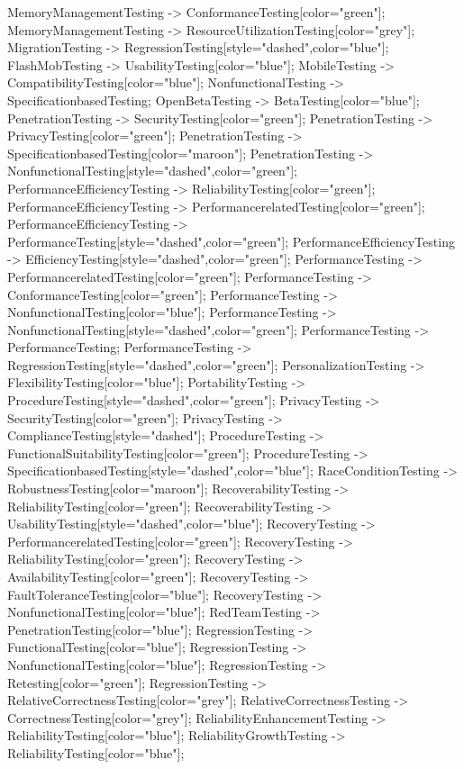 \documentclass{article}
\begin{document}
{MemoryManagementTesting -> ConformanceTesting[color="green"];
MemoryManagementTesting -> ResourceUtilizationTesting[color="grey"];
MigrationTesting -> RegressionTesting[style="dashed",color="blue"];
FlashMobTesting -> UsabilityTesting[color="blue"];
MobileTesting -> CompatibilityTesting[color="blue"];
NonfunctionalTesting -> SpecificationbasedTesting;
OpenBetaTesting -> BetaTesting[color="blue"];
PenetrationTesting -> SecurityTesting[color="green"];
PenetrationTesting -> PrivacyTesting[color="green"];
PenetrationTesting -> SpecificationbasedTesting[color="maroon"];
PenetrationTesting -> NonfunctionalTesting[style="dashed",color="green"];
PerformanceEfficiencyTesting -> ReliabilityTesting[color="green"];
PerformanceEfficiencyTesting -> PerformancerelatedTesting[color="green"];
PerformanceEfficiencyTesting -> PerformanceTesting[style="dashed",color="green"];
PerformanceEfficiencyTesting -> EfficiencyTesting[style="dashed",color="green"];
PerformanceTesting -> PerformancerelatedTesting[color="green"];
PerformanceTesting -> ConformanceTesting[color="green"];
PerformanceTesting -> NonfunctionalTesting[color="blue"];
PerformanceTesting -> NonfunctionalTesting[style="dashed",color="green"];
PerformanceTesting -> PerformanceTesting;
PerformanceTesting -> RegressionTesting[style="dashed",color="green"];
PersonalizationTesting -> FlexibilityTesting[color="blue"];
PortabilityTesting -> ProcedureTesting[style="dashed",color="green"];
PrivacyTesting -> SecurityTesting[color="green"];
PrivacyTesting -> ComplianceTesting[style="dashed"];
ProcedureTesting -> FunctionalSuitabilityTesting[color="green"];
ProcedureTesting -> SpecificationbasedTesting[style="dashed",color="blue"];
RaceConditionTesting -> RobustnessTesting[color="maroon"];
RecoverabilityTesting -> ReliabilityTesting[color="green"];
RecoverabilityTesting -> UsabilityTesting[style="dashed",color="blue"];
RecoveryTesting -> PerformancerelatedTesting[color="green"];
RecoveryTesting -> ReliabilityTesting[color="green"];
RecoveryTesting -> AvailabilityTesting[color="green"];
RecoveryTesting -> FaultToleranceTesting[color="blue"];
RecoveryTesting -> NonfunctionalTesting[color="blue"];
RedTeamTesting -> PenetrationTesting[color="blue"];
RegressionTesting -> FunctionalTesting[color="blue"];
RegressionTesting -> NonfunctionalTesting[color="blue"];
RegressionTesting -> Retesting[color="green"];
RegressionTesting -> RelativeCorrectnessTesting[color="grey"];
RelativeCorrectnessTesting -> CorrectnessTesting[color="grey"];
ReliabilityEnhancementTesting -> ReliabilityTesting[color="blue"];
ReliabilityGrowthTesting -> ReliabilityTesting[color="blue"];
}
\end{document}
